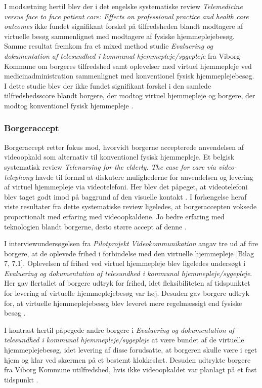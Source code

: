 I modsætning hertil blev der i det engelske systematiske review \textit{Telemedicine versus face to face patient care: Effects on professional practice and health care outcomes} ikke fundet signifikant forskel på tilfredsheden blandt modtagere af virtuelle besøg sammenlignet med modtagere af fysiske hjemmeplejebesøg\cite{Paf2}. 
\\Samme resultat fremkom fra et mixed method studie \textit{Evaluering og dokumentation af telesundhed i kommunal hjemmepleje/sygepleje} fra Viborg Kommune om borgeres tilfredshed samt oplevelser med virtuel hjemmepleje ved medicinadministration sammenlignet med konventionel fysisk hjemmeplejebesøg. I dette studie blev der ikke fundet signifikant forskel i den samlede tilfredshedsscore blandt borgere, der modtog virtuel hjemmepleje og borgere, der modtog konventionel fysisk hjemmepleje \cite{kandidat}.

\subsubsection{Borgeraccept}
Borgeraccept retter fokus mod, hvorvidt borgerne accepterede anvendelsen af videoopkald som alternativ til konventionel fysisk hjemmepleje. Et belgisk systematisk review \textit{Telenursing for the elderly. The case for care via video-telephony} havde til formal at diskutere mulighederne for anvendelsen og levering af virtuel hjemmepleje via videotelefoni. Her blev det påpeget, at videotelefoni blev taget godt imod på baggrund af den visuelle kontakt \cite{telenursing}. I forlængelse heraf viste resultater fra dette systematiske review ligeledes, at borgeraccepten voksede proportionalt med erfaring med videoopkaldene. Jo bedre erfaring med teknologien blandt borgerne, desto større accept af denne \cite{telenursing}.

I interviewundersøgelsen fra \textit{Pilotprojekt Videokommunikation} angav tre ud af fire borgere, at de oplevede frihed i forbindelse med den virtuelle hjemmepleje [Bilag 7, 7.1]. Oplevelsen af frihed ved virtuel hjemmepleje blev ligeledes undersøgt i \textit{Evaluering og dokumentation af telesundhed i kommunal hjemmepleje/sygepleje}. Her gav flertallet af borgere udtryk for frihed, idet fleksibiliteten af tidspunktet for levering af virtuelle hjemmeplejebesøg var høj. Desuden gav borgere udtryk for, at virtuelle hjemmeplejebesøg blev leveret mere regelmæssigt end fysiske besøg \cite{kandidat}.
 
I kontrast hertil påpegede andre borgere i \textit{Evaluering og dokumentation af telesundhed i kommunal hjemmepleje/sygepleje} at være bundet af de virtuelle hjemmeplejebesøg, idet levering af disse forudsatte, at borgeren skulle være i eget hjem og klar ved skærmen på et bestemt klokkeslæt. Desuden udtrykte borgere fra Viborg Kommune utilfredshed, hvis ikke videoopkaldet var planlagt på et fast tidspunkt \cite{kandidat}.
 
